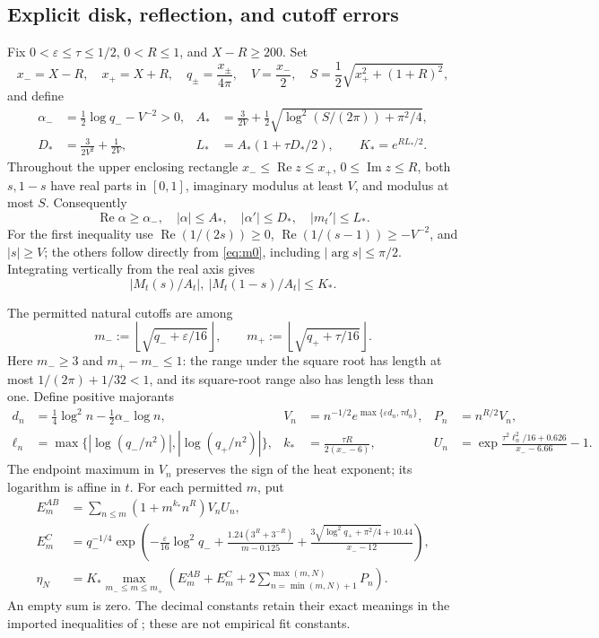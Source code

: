 \documentclass[11pt]{article}
\numberwithin{equation}{section}
\theoremstyle{definition}
\theoremstyle{remark}
\DeclareMathOperator{\Rea}{Re}
\DeclareMathOperator{\Ima}{Im}
\begin{document}
\subsection{Explicit disk, reflection, and cutoff errors}
Fix $0<\varepsilon\le\tau\le1/2$, $0<R\le1$, and $X-R\ge200$.
Set
\[
 x_-=X-R,\quad x_+=X+R,\quad q_\pm=\frac{x_\pm}{4\pi},
 \quad V=\frac{x_-}{2},\quad S=\frac12\sqrt{x_+^2+(1+R)^2},
\]
and define
\begin{align}\label{eq:diskconstants}
 \alpha_-&=\frac12\log q_- -V^{-2}>0,&
 A_*&=\frac{3}{2V}+\frac12
           \sqrt{\log^2(S/(2\pi))+\pi^2/4},\\
 D_*&=\frac{3}{2V^2}+\frac1{2V},&
 L_*&=A_*(1+\tau D_*/2),\qquad K_*=e^{RL_*/2}.\nonumber
\end{align}
Throughout the upper enclosing rectangle
$x_-\le\Rea z\le x_+$, $0\le\Ima z\le R$, both $s,1-s$ have
real parts in $[0,1]$, imaginary modulus at least $V$, and modulus
at most $S$. Consequently
\begin{equation}\label{eq:alphabounds}
 \Rea\alpha\ge\alpha_-,\quad |\alpha|\le A_*,\quad
 |\alpha'|\le D_*,\quad |m_t'|\le L_*.
\end{equation}
For the first inequality use
$\Rea(1/(2s))\ge0$, $\Rea(1/(s-1))\ge-V^{-2}$, and $|s|\ge V$;
the others follow directly from \eqref{eq:m0}, including
$|\arg s|\le\pi/2$. Integrating vertically from the real axis gives
\begin{equation}\label{eq:normalizercost}
 |M_t(s)/A_t|,\ |M_t(1-s)/A_t|\le K_*.
\end{equation}

The permitted natural cutoffs are among
\[
 m_-:=\left\lfloor\sqrt{q_-+\varepsilon/16}\right\rfloor,
 \qquad m_+:=\left\lfloor\sqrt{q_++\tau/16}\right\rfloor.
\]
Here $m_-\ge3$ and $m_+-m_-\le1$: the range under the square
root has length at most $1/(2\pi)+1/32<1$, and its square-root
range also has length less than one. Define positive majorants
\begin{align}\label{eq:termmajorants}
 d_n&=\tfrac14\log^2n-\tfrac12\alpha_-\log n,&
 V_n&=n^{-1/2}e^{\max\{\varepsilon d_n,\tau d_n\}},&
 P_n&=n^{R/2}V_n,\\
 \ell_n&=\max\{|\log(q_-/n^2)|,|\log(q_+/n^2)|\},&
 k_*&=\frac{\tau R}{2(x_--6)},&
 U_n&=\exp\frac{\tau^2\ell_n^2/16+0.626}{x_--6.66}-1.\nonumber
\end{align}
The endpoint maximum in $V_n$ preserves the sign of the heat exponent;
its logarithm is affine in $t$. For each permitted $m$, put
\begin{align}\label{eq:eta}
 E_m^{AB}&=\sum_{n\le m}(1+m^{k_*}n^R)V_nU_n,\\
 E_m^C&=q_-^{-1/4}\exp\left(-\frac\varepsilon{16}\log^2q_-
 +\frac{1.24(3^R+3^{-R})}{m-0.125}
 +\frac{3\sqrt{\log^2q_++\pi^2/4}+10.44}{x_--12}\right),\nonumber\\
 \eta_N&=K_*\max_{m_-\le m\le m_+}
 \left(E_m^{AB}+E_m^C
 +2\sum_{n=\min(m,N)+1}^{\max(m,N)}P_n\right).\nonumber
\end{align}
An empty sum is zero. The decimal constants retain their exact meanings
in the imported inequalities of \cite{polymath}; these are not empirical
fit constants.
\end{document}
